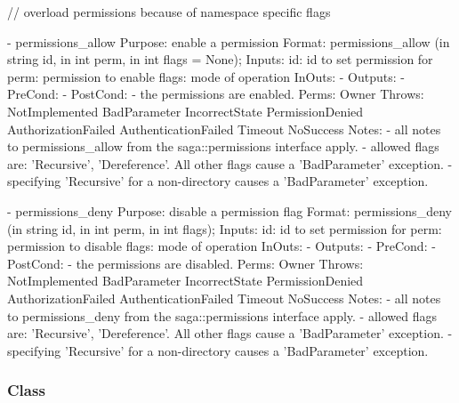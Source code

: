 \begin{myspec}
 
    // overload permissions because of namespace specific flags
 
    - permissions_allow
      Purpose:  enable a permission 
      Format:   permissions_allow    (in  string  id,
                                      in  int     perm, 
                                      in  int     flags = None);
      Inputs:   id:                   id to set permission for
                perm:                 permission to enable
                flags:                mode of operation
      InOuts:   -
      Outputs:  -
      PreCond:  -
      PostCond: - the permissions are enabled.
      Perms:    Owner
      Throws:   NotImplemented
                BadParameter
                IncorrectState
                PermissionDenied
                AuthorizationFailed
                AuthenticationFailed
                Timeout
                NoSuccess
      Notes:    - all notes to permissions_allow from the
                  saga::permissions interface apply.
                - allowed flags are: 'Recursive', 'Dereference'.
                  All other flags cause a 'BadParameter'
                  exception.
                - specifying 'Recursive' for a non-directory
                  causes a 'BadParameter' exception.
 
 
    - permissions_deny
      Purpose:  disable a permission flag
      Format:   permissions_deny     (in  string     id,
                                      in  int        perm,
                                      in  int        flags);
      Inputs:   id:                   id to set permission for
                perm:                 permission to disable
                flags:                mode of operation
      InOuts:   -
      Outputs:  -
      PreCond:  -
      PostCond: - the permissions are disabled.
      Perms:    Owner
      Throws:   NotImplemented
                BadParameter
                IncorrectState
                PermissionDenied
                AuthorizationFailed
                AuthenticationFailed
                Timeout
                NoSuccess
      Notes:    - all notes to permissions_deny from the
                  saga::permissions interface apply.
                - allowed flags are: 'Recursive', 'Dereference'.
                  All other flags cause a 'BadParameter'
                  exception.
                - specifying 'Recursive' for a non-directory
                  causes a 'BadParameter' exception.
 \end{myspec}
 
 
  \subsubsection*{Class }
 
